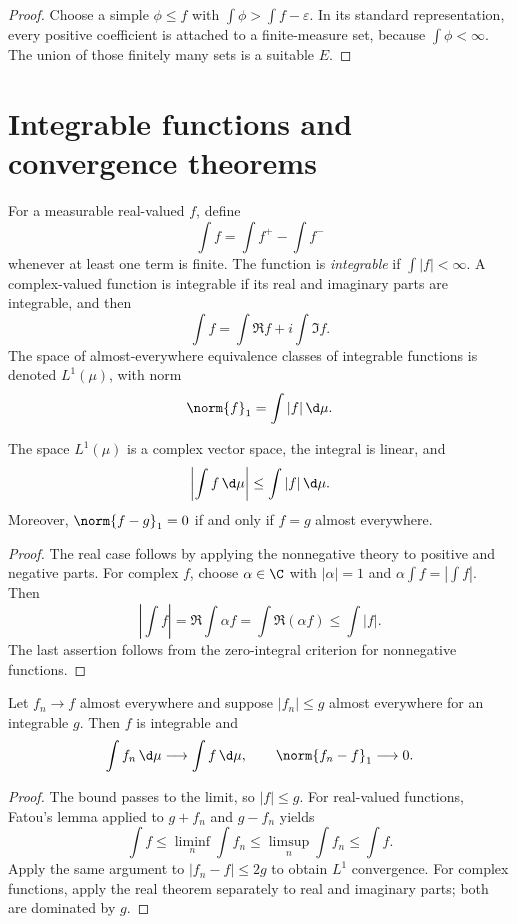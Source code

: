 \begin{proof}
Choose a simple $\phi\leq f$ with $\int\phi>\int f-\varepsilon$. In its standard representation, every positive coefficient is attached to a finite-measure set, because $\int\phi<\infty$. The union of those finitely many sets is a suitable $E$.
\end{proof}

\section{Integrable functions and convergence theorems}

\begin{de}
For a measurable real-valued $f$, define
\[
\int f=\int f^+-\int f^-
\]
whenever at least one term is finite. The function is \emph{integrable} if $\int|f|<\infty$. A complex-valued function is integrable if its real and imaginary parts are integrable, and then
\[
\int f=\int\Re f+i\int\Im f.
\]
The space of almost-everywhere equivalence classes of integrable functions is denoted $L^1(\mu)$, with norm
\[
\norm{f}_1=\int|f|\,\d\mu.
\]
\end{de}

\begin{prop}
The space $L^1(\mu)$ is a complex vector space, the integral is linear, and
\[
\left|\int f\,\d\mu\right|\leq\int|f|\,\d\mu.
\]
Moreover, $\norm{f-g}_1=0$ if and only if $f=g$ almost everywhere.
\end{prop}

\begin{proof}
The real case follows by applying the nonnegative theory to positive and negative parts. For complex $f$, choose $\alpha\in\C$ with $|\alpha|=1$ and $\alpha\int f=|\int f|$. Then
\[
\left|\int f\right|=\Re\int\alpha f
 =\int\Re(\alpha f)\leq\int|f|.
\]
The last assertion follows from the zero-integral criterion for nonnegative functions.
\end{proof}

\begin{thm}
Let $f_n\to f$ almost everywhere and suppose $|f_n|\leq g$ almost everywhere for an integrable $g$. Then $f$ is integrable and
\[
\int f_n\,\d\mu\longrightarrow\int f\,\d\mu,
\qquad
\norm{f_n-f}_1\longrightarrow0.
\]
\end{thm}

\begin{proof}
The bound passes to the limit, so $|f|\leq g$. For real-valued functions, Fatou's lemma applied to $g+f_n$ and $g-f_n$ yields
\[
\int f\leq\liminf_n\int f_n
\leq\limsup_n\int f_n\leq\int f.
\]
Apply the same argument to $|f_n-f|\leq2g$ to obtain $L^1$ convergence. For complex functions, apply the real theorem separately to real and imaginary parts; both are dominated by $g$.
\end{proof}

